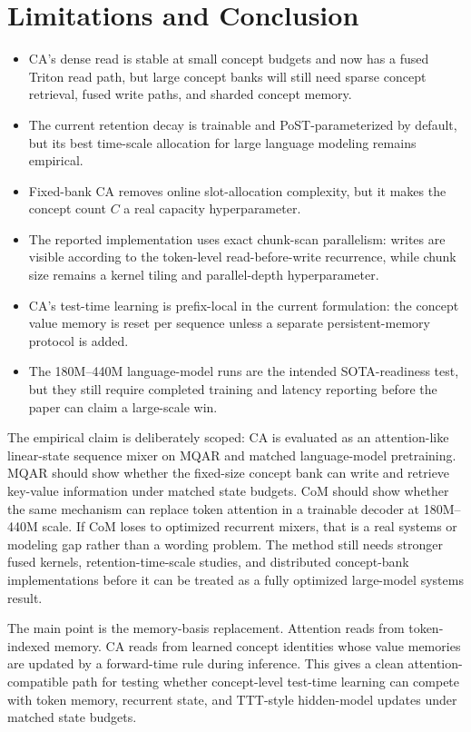 \section{Limitations and Conclusion}
\label{sec:main-limitations}

\begin{itemize}
\item CA's dense read is stable at small concept budgets and now has a fused Triton read path, but large concept banks will still need sparse concept retrieval, fused write paths, and sharded concept memory.
\item The current retention decay is trainable and PoST-parameterized by default, but its best time-scale allocation for large language modeling remains empirical.
\item Fixed-bank CA removes online slot-allocation complexity, but it makes the concept count $C$ a real capacity hyperparameter.
\item The reported implementation uses exact chunk-scan parallelism: writes are visible according to the token-level read-before-write recurrence, while chunk size remains a kernel tiling and parallel-depth hyperparameter.
\item CA's test-time learning is prefix-local in the current formulation: the concept value memory is reset per sequence unless a separate persistent-memory protocol is added.
\item The 180M--440M language-model runs are the intended SOTA-readiness test, but they still require completed training and latency reporting before the paper can claim a large-scale win.
\end{itemize}

The empirical claim is deliberately scoped: CA is evaluated as an attention-like linear-state sequence mixer on MQAR and matched language-model pretraining. MQAR should show whether the fixed-size concept bank can write and retrieve key-value information under matched state budgets. CoM should show whether the same mechanism can replace token attention in a trainable decoder at 180M--440M scale. If CoM loses to optimized recurrent mixers, that is a real systems or modeling gap rather than a wording problem. The method still needs stronger fused kernels, retention-time-scale studies, and distributed concept-bank implementations before it can be treated as a fully optimized large-model systems result.

The main point is the memory-basis replacement. Attention reads from token-indexed memory. CA reads from learned concept identities whose value memories are updated by a forward-time rule during inference. This gives a clean attention-compatible path for testing whether concept-level test-time learning can compete with token memory, recurrent state, and TTT-style hidden-model updates under matched state budgets.
